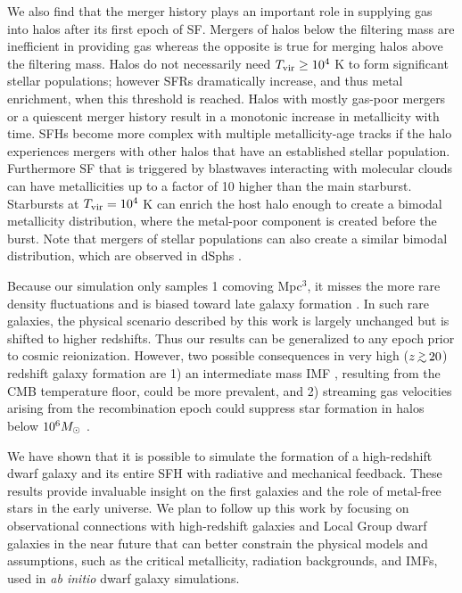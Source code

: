 \documentclass[apjl]{emulateapj}
\begin{document}
We also find that the merger history plays an important role in
supplying gas into halos after its first epoch of SF.  Mergers of
halos below the filtering mass are inefficient in providing gas
whereas the opposite is true for merging halos above the filtering
mass.  Halos do not necessarily need $\tvir \ge 10^4$ K to form
significant stellar populations; however SFRs dramatically increase,
and thus metal enrichment, when this threshold is reached.  Halos with
mostly gas-poor mergers or a quiescent merger history result in a
monotonic increase in metallicity with time.  SFHs become more complex
with multiple metallicity-age tracks if the halo experiences mergers
with other halos that have an established stellar population.
Furthermore SF that is triggered by blastwaves interacting with
molecular clouds can have metallicities up to a factor of 10 higher
than the main starburst.  Starbursts at $\tvir = 10^4$ K can enrich
the host halo enough to create a bimodal metallicity distribution,
where the metal-poor component is created before the burst.  Note that
mergers of stellar populations can also create a similar bimodal
distribution, which are observed in dSphs \citep{Battaglia11}.

Because our simulation only samples 1 comoving Mpc$^3$, it misses the
more rare density fluctuations and is biased toward late galaxy
formation \citep{Barkana04}.  In such rare galaxies, the physical
scenario described by this work is largely unchanged but is shifted to
higher redshifts.  Thus our results can be generalized to any epoch
prior to cosmic reionization.  However, two possible consequences in
very high ($z \gsim 20$) redshift galaxy formation are 1) an
intermediate mass IMF \citep{Larson98, Tumlinson07_IMF,
  2009ApJ...691..441S}, resulting from the CMB temperature floor,
could be more prevalent, and 2) streaming gas velocities arising from
the recombination epoch \citep{Tselia10} could suppress star formation
in halos below $10^6 \Ms$ \citep{Tselia10_Minihalo, Greif11_Delay}.

We have shown that it is possible to simulate the formation of a
high-redshift dwarf galaxy and its entire SFH with radiative and
mechanical feedback.  These results provide invaluable insight on the
first galaxies and the role of metal-free stars in the early universe.
We plan to follow up this work by focusing on observational
connections with high-redshift galaxies and Local Group dwarf galaxies
in the near future that can better constrain the physical models and
assumptions, such as the critical metallicity, radiation backgrounds,
and IMFs, used in \textit{ab initio} dwarf galaxy simulations.
\end{document}
